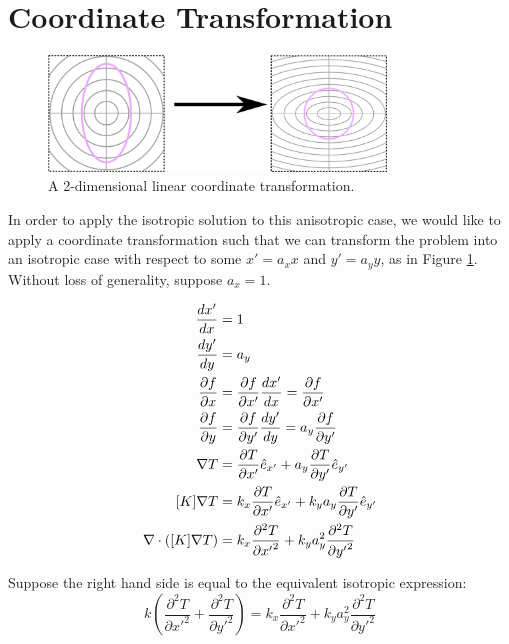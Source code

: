 \section{Coordinate Transformation}
\label{sec:analytical-np:transformation}

\begin{figure}[h]
\centering
\includegraphics[width=0.8\textwidth]{fig/coordinate_transformation.png}
\caption{A 2-dimensional linear coordinate transformation.}
\label{fig:coord_trans}
\end{figure}

In order to apply the isotropic solution to this anisotropic case, we would like
to apply a coordinate transformation such that we can transform the problem into
an isotropic case with respect to some \(x' = a_x x\) and \(y' = a_y y\), as in
Figure \ref{fig:coord_trans}.
Without loss of generality, suppose \(a_x = 1\).

\begin{align}
\frac{dx'}{dx} &= 1\\
\frac{dy'}{dy} &= a_y\\
\frac{\partial f}{\partial x} &= \frac{\partial f}{\partial x'}\frac{dx'}{dx} = \frac{\partial f}{\partial x'}\\
\frac{\partial f}{\partial y} &= \frac{\partial f}{\partial y'}\frac{dy'}{dy} = a_y\frac{\partial f}{\partial y'}\\
\nabla T &= \frac{\partial T}{\partial x'} \hat{e}_{x'} + a_y\frac{\partial T}{\partial y'} \hat{e}_{y'} \\
[K]\nabla T &= k_x\frac{\partial T}{\partial x'} \hat{e}_{x'} + k_ya_y\frac{\partial T}{\partial y'} \hat{e}_{y'}\\
\nabla \cdot \left([K]\nabla T\right) &= k_x\frac{\partial^2 T}{\partial {x'}^2} + k_ya_y^2\frac{\partial^2 T}{\partial {y'}^2}\\
\end{align}

Suppose the right hand side is equal to the equivalent isotropic expression:
\begin{equation*}
k\left(\frac{\partial^2 T}{\partial {x'}^2} + \frac{\partial^2 T}{\partial {y'}^2} \right) = k_x\frac{\partial^2 T}{\partial {x'}^2} + k_ya_y^2\frac{\partial^2 T}{\partial {y'}^2}
\end{equation*}

